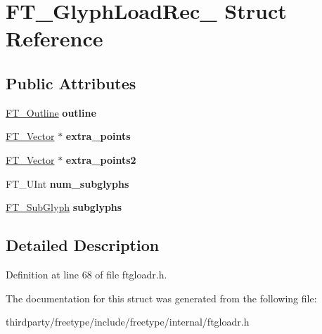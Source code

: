 \hypertarget{struct_f_t___glyph_load_rec__}{}\section{F\+T\+\_\+\+Glyph\+Load\+Rec\+\_\+ Struct Reference}
\label{struct_f_t___glyph_load_rec__}
\subsection*{Public Attributes}
\begin{DoxyCompactItemize}
\item 
\mbox{\label{struct_f_t___glyph_load_rec___ae340cdb5263322e86c640b15f82ea72a}} 
\hyperlink{struct_f_t___outline__}{F\+T\+\_\+\+Outline} {\bfseries outline}
\item 
\mbox{\label{struct_f_t___glyph_load_rec___ad2547bd6a7c7473d3a4646dfe908f1c3}} 
\hyperlink{struct_f_t___vector__}{F\+T\+\_\+\+Vector} $\ast$ {\bfseries extra\+\_\+points}
\item 
\mbox{\label{struct_f_t___glyph_load_rec___a5e8bbe62bd889e806700bc0d583ff79b}} 
\hyperlink{struct_f_t___vector__}{F\+T\+\_\+\+Vector} $\ast$ {\bfseries extra\+\_\+points2}
\item 
\mbox{\label{struct_f_t___glyph_load_rec___a71dc4ab52b956b974fe65c95a098e03c}} 
F\+T\+\_\+\+U\+Int {\bfseries num\+\_\+subglyphs}
\item 
\mbox{\label{struct_f_t___glyph_load_rec___a12ef145fedbeb14cc8b9d320ae3fed96}} 
\hyperlink{struct_f_t___sub_glyph_rec__}{F\+T\+\_\+\+Sub\+Glyph} {\bfseries subglyphs}
\end{DoxyCompactItemize}


\subsection{Detailed Description}


Definition at line 68 of file ftgloadr.\+h.



The documentation for this struct was generated from the following file\+:\begin{DoxyCompactItemize}
\item 
thirdparty/freetype/include/freetype/internal/ftgloadr.\+h\end{DoxyCompactItemize}
